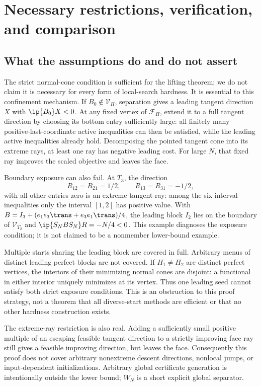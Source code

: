 \section{Necessary restrictions, verification, and comparison}\label{sec:scope}
\subsection{What the assumptions do and do not assert}
The strict normal-cone condition is sufficient for the lifting theorem; we do not claim it is necessary for every form of local-search hardness. It is essential to this confinement mechanism. If $B_0\notin\mathcal V_H$, separation gives a leading tangent direction $X$ with $\ip{B_0}X<0$. At any fixed vertex of $\mathcal F_H$, extend it to a full tangent direction by choosing its bottom entry sufficiently large: all finitely many positive-last-coordinate active inequalities can then be satisfied, while the leading active inequalities already hold. Decomposing the pointed tangent cone into its extreme rays, at least one ray has negative leading cost. For large $N$, that fixed ray improves the scaled objective and leaves the face.

Boundary exposure can also fail. At $T_3$, the direction
\[
 R_{12}=R_{21}=1/2,\qquad R_{13}=R_{31}=-1/2,
\]
with all other entries zero is an extreme tangent ray: among the six interval inequalities only the interval $[1,2]$ has positive value. With $B=I_3+(e_1e_3\trans+e_3e_1\trans)/4$, the leading block $I_2$ lies on the boundary of $\mathcal V_{T_2}$ and $\ip{S_NBS_N}R=-N/4<0$. This example diagnoses the exposure condition; it is not claimed to be a nonmember lower-bound example.

Multiple starts sharing the leading block are covered in full. Arbitrary menus of distinct leading perfect blocks are not covered. If $H_1\ne H_2$ are distinct perfect vertices, the interiors of their minimizing normal cones are disjoint: a functional in either interior uniquely minimizes at its vertex. Thus one leading seed cannot satisfy both strict exposure conditions. This is an obstruction to this proof strategy, not a theorem that all diverse-start methods are efficient or that no other hardness construction exists.

The extreme-ray restriction is also real. Adding a sufficiently small positive multiple of an escaping feasible tangent direction to a strictly improving face ray still gives a feasible improving direction, but leaves the face. Consequently this proof does not cover arbitrary nonextreme descent directions, nonlocal jumps, or input-dependent initializations. Arbitrary global certificate generation is intentionally outside the lower bound; $W_N$ is a short explicit global separator.

